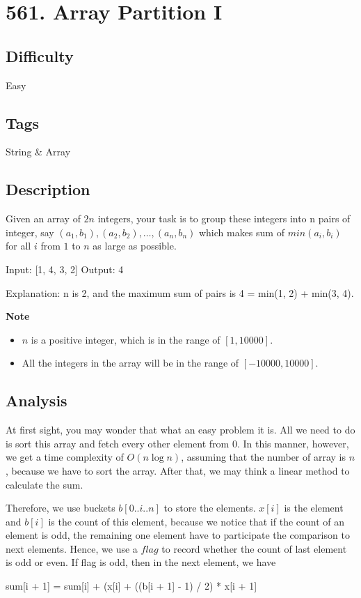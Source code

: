 \tocless\section{561. Array Partition I}
\label{algo:561}

\subsection*{Difficulty}
Easy

\subsection*{Tags}
String \& Array

\subsection*{Description}
Given an array of $2n$ integers, your task is to group these integers into n pairs of integer, say $(a_1, b_1), (a_2, b_2), \dots, (a_n, b_n)$ which makes sum of $min(a_i, b_i)$ for all $i$ from $1$ to $n$ as large as possible.

\begin{example}
\begin{multilinecode}
Input: [1, 4, 3, 2]
Output: 4

Explanation: n is 2, and the maximum sum of pairs is 4 = min(1, 2) + min(3, 4).
\end{multilinecode}
\end{example}

\textbf{Note}
\begin{itemize}
    \item $n$ is a positive integer, which is in the range of $[1, 10000]$.
    \item All the integers in the array will be in the range of $[-10000, 10000]$.
\end{itemize}

\subsection*{Analysis}
At first sight, you may wonder that what an easy problem it is. All we need to do is sort this array and fetch every other element from 0. In this manner, however, we get a time complexity of $O(n{\log}n)$, assuming that the number of array is $n$, because we have to sort the array. After that, we may think a linear method to calculate the sum.

Therefore, we use buckets $b[0..i..n]$ to store the elements. $x[i]$ is the element and $b[i]$ is the count of this element, because we notice that if the count of an element is odd, the remaining one element have to participate the comparison to next elements. Hence, we use a $flag$ to record whether the count of last element is odd or even. If flag is odd, then in the next element, we have
\begin{multilinecode}
sum[i + 1] = sum[i] + (x[i] + ((b[i + 1] - 1) / 2) * x[i + 1]
\end{multilinecode}

